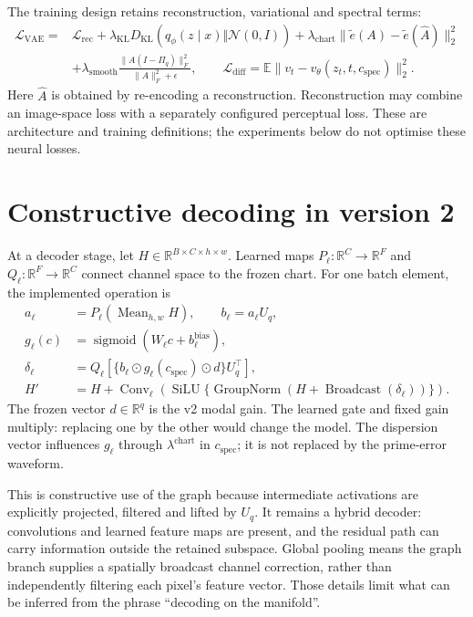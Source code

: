 \documentclass[10pt]{article}
\newcommand{\R}{\mathbb{R}}
\newcommand{\Uq}{U_q}
\newcommand{\E}{\mathbb{E}}
\begin{document}
The training design retains reconstruction, variational and spectral
terms:
\begin{align}
 \mathcal L_{\mathrm{VAE}}={}&
 \mathcal L_{\mathrm{rec}}+
 \lambda_{\mathrm{KL}}D_{\mathrm{KL}}(q_\phi(z\mid x)\Vert\mathcal N(0,I))
 +\lambda_{\mathrm{chart}}\|\widetilde e(A)-\widetilde e(\widehat A)\|_2^2
 \nonumber\\[-2pt]
 &+\lambda_{\mathrm{smooth}}
 \frac{\|A(I-\Pi_q)\|_F^2}{\|A\|_F^2+\epsilon},\qquad
 \mathcal L_{\mathrm{diff}}=\E\|v_t-v_\theta(z_t,t,c_{\mathrm{spec}})\|_2^2.
 \label{eq:loss}
\end{align}
Here $\widehat A$ is obtained by re-encoding a reconstruction.
Reconstruction may combine an image-space loss with a separately
configured perceptual loss. These are architecture and training
definitions; the experiments below do not optimise these neural losses.

\section{Constructive decoding in version 2}
\label{sec:decoder}

At a decoder stage, let $H\in\R^{B\times C\times h\times w}$.
Learned maps $P_\ell:\R^C\rightarrow\R^F$ and
$Q_\ell:\R^F\rightarrow\R^C$ connect channel space to the frozen chart.
For one batch element, the implemented operation is
\begin{align}
 a_\ell &=P_\ell\!\left(\operatorname{Mean}_{h,w}H\right),\qquad
 b_\ell=a_\ell\Uq,\\
 g_\ell(c)&=\operatorname{sigmoid}(W_\ell c+b_\ell^{\mathrm{bias}}),\\
 \delta_\ell
 &=Q_\ell\!\left[
  \{b_\ell\odot g_\ell(c_{\mathrm{spec}})\odot d\}\Uq^\top
 \right],\\
 H'&=H+\operatorname{Conv}_\ell\!\left(
  \operatorname{SiLU}\{\operatorname{GroupNorm}
       (H+\operatorname{Broadcast}(\delta_\ell))\}\right).
 \label{eq:block}
\end{align}
The frozen vector $d\in\R^q$ is the v2 modal gain. The learned gate and
fixed gain multiply: replacing one by the other would change the model.
The dispersion vector influences $g_\ell$ through
$\lambda^{\mathrm{chart}}$ in $c_{\mathrm{spec}}$; it is not replaced by
the prime-error waveform.

This is constructive use of the graph because intermediate activations
are explicitly projected, filtered and lifted by $\Uq$. It remains a
hybrid decoder: convolutions and learned feature maps are present, and
the residual path can carry information outside the retained subspace.
Global pooling means the graph branch supplies a spatially broadcast
channel correction, rather than independently filtering each pixel's
feature vector. Those details limit what can be inferred from the phrase
``decoding on the manifold''.
\end{document}
